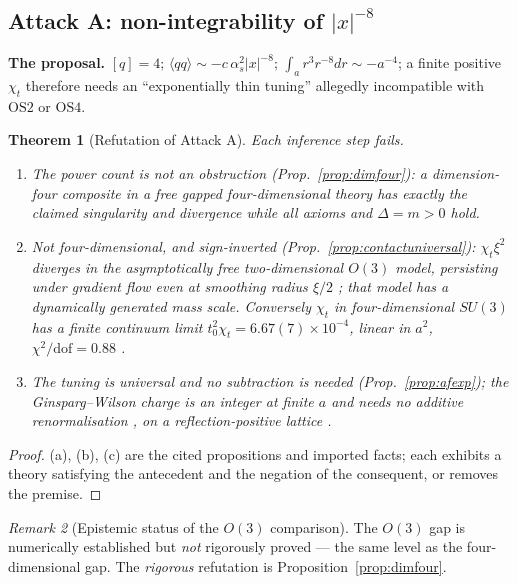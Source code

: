 \documentclass[11pt,a4paper]{article}
\theoremstyle{plain}
\newtheorem{theorem}{Theorem}[section]
\theoremstyle{definition}
\theoremstyle{remark}
\newtheorem{remark}[theorem]{Remark}
\newcommand{\OS}{\mathrm{OS}}\newcommand{\Gap}{\mathrm{Gap}}
\newcommand{\Chit}{\chi_t}
\renewcommand{\_}{\oldunderscore\allowbreak}
\begin{document}
\subsection{Attack A: non-integrability of \texorpdfstring{$|x|^{-8}$}{|x|^-8}}
\textbf{The proposal.} $[q]=4$; $\langle qq\rangle\sim-c\,\alpha_s^2|x|^{-8}$;
$\int_ar^3r^{-8}dr\sim-a^{-4}$; a finite positive $\Chit$ therefore needs an ``exponentially thin
tuning'' allegedly incompatible with $\OS2$ or $\OS4$.
\begin{theorem}[Refutation of Attack A]\label{thm:attackA}
Each inference step fails.
\begin{enumerate}[label=(\alph*),leftmargin=22pt,itemsep=2pt]
\item \emph{The power count is not an obstruction} (Prop.~\ref{prop:dimfour}): a dimension-four
composite in a free gapped four-dimensional theory has exactly the claimed singularity and
divergence while all axioms and $\Delta=m>0$ hold.
\item \emph{Not four-dimensional, and sign-inverted}
(Prop.~\ref{prop:contactuniversal}): $\Chit\xi^2$ \emph{diverges} in the asymptotically free
two-dimensional $O(3)$ model, persisting under gradient flow even at smoothing radius $\xi/2$
\cite{Bietenholz2018,Thomas2021}; that model has a dynamically generated mass scale. Conversely
$\Chit$ in four-dimensional $SU(3)$ has a \emph{finite} continuum limit
$t_0^2\Chit=6.67(7)\times10^{-4}$, linear in $a^2$, $\chi^2/\mathrm{dof}=0.88$ \cite{Ce2015}.
\item \emph{The tuning is universal and no subtraction is needed}
(Prop.~\ref{prop:afexp}); the Ginsparg--Wilson charge is an integer at finite $a$ and needs no
additive renormalisation \cite{Schierholz2024}, on a reflection-positive lattice
\cite{OsterwalderSeiler1978}.
\end{enumerate}
\end{theorem}
\begin{proof}
(a), (b), (c) are the cited propositions and imported facts; each exhibits a theory satisfying
the antecedent and the negation of the consequent, or removes the premise.
\end{proof}
\begin{remark}[Epistemic status of the $O(3)$ comparison]
The $O(3)$ gap is numerically established but \emph{not} rigorously proved --- the same level as
the four-dimensional gap. The \emph{rigorous} refutation is Proposition~\ref{prop:dimfour}.
\end{remark}
\end{document}
